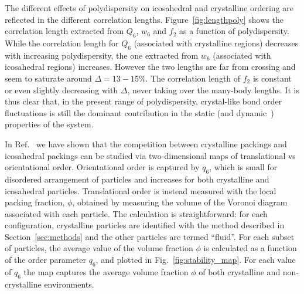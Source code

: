 \documentclass[twocolumn,superscriptaddress]{revtex4}
\begin{document}
The different effects of polydispersity on icosahedral and crystalline ordering are reflected in the different correlation lengths.
Figure~\ref{fig:lengthpoly} shows the correlation length extracted from $Q_6$, $w_6$ and $f_2$ as a function of polydispersity. While the correlation length for $Q_6$ (associated with crystalline regions) decreases with increasing polydispersity, the one extracted from $w_6$ (associated with icosahedral regions) increases.
However the two lengths are far from crossing and seem to saturate around $\Delta=13-15\%$. The correlation length of $f_2$ is constant or even slightly decreasing with $\Delta$, never taking over the many-body lengths. It is thus clear that, in the present range of polydispersity, crystal-like bond order fluctuations is still the dominant contribution in the static (and dynamic~\cite{mathieu_icosahedra}) properties of the system.

In Ref.~\cite{russo_hs} we have shown that the competition between crystalline packings and
icosahedral packings can be studied via two-dimensional maps of translational vs orientational order.
Orientational order is captured by $q_6$, which is small for disordered arrangement of particles and
increases for both crystalline and icosahedral particles. Translational order is instead measured with
the local packing fraction, $\phi$, obtained by measuring the volume of the Voronoi diagram associated with
each particle. The calculation is straightforward: for each
configuration, crystalline particles are identified with the method described in Section~\ref{sec:methods} and the other particles are termed ``fluid''. For each subset of particles, the average value of the volume fraction $\phi$ is calculated as a function of the order parameter $q_6$, and plotted in Fig.~\ref{fig:stability_map}.
For each value of $q_6$ the map captures the average volume fraction $\phi$ of both crystalline and non-crystalline
environments.
\end{document}
